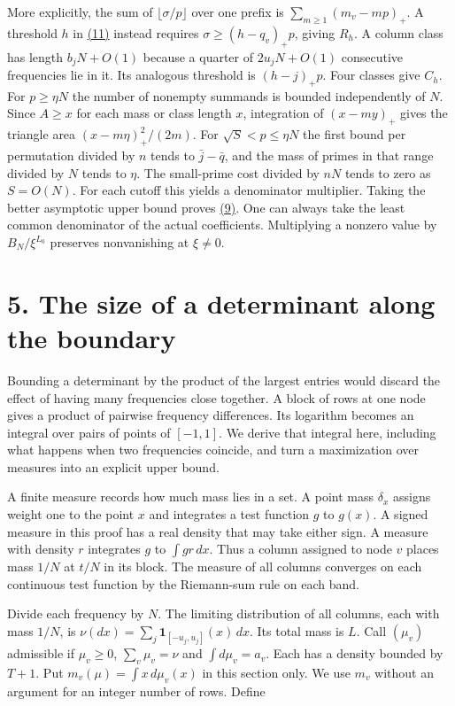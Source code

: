 \documentclass[11pt,a4paper]{article}
\newcounter{none}
\begin{document}
More explicitly, the sum of \(\lfloor\sigma/p\rfloor\) over one prefix is \(\sum_{m\ge1}(m_v-mp)_+\). A threshold \(h\) in \hyperref[eq:11]{(11)} instead requires \(\sigma\ge(h-q_v)_+p\), giving \(R_h\). A column class has length \(b_jN+O(1)\) because a quarter of \(2u_jN+O(1)\) consecutive frequencies lie in it. Its analogous threshold is \((h-j)_+p\). Four classes give \(C_h\). For \(p\ge\eta N\) the number of nonempty summands is bounded independently of \(N\). Since \(A\ge x\) for each mass or class length \(x\), integration of \((x-my)_+\) gives the triangle area \((x-m\eta)_+^2/(2m)\). For \(\sqrt S<p\le\eta N\) the first bound per permutation divided by \(n\) tends to \(\bar j-\bar q\), and the mass of primes in that range divided by \(N\) tends to \(\eta\). The small-prime cost divided by \(nN\) tends to zero as \(S=O(N)\). For each cutoff this yields a denominator multiplier. Taking the better asymptotic upper bound proves \hyperref[eq:9]{(9)}. One can always take the least common denominator of the actual coefficients. Multiplying a nonzero value by \(B_N/\xi^{L_0}\) preserves nonvanishing at \(\xi\ne0\).

\section{5. The size of a determinant along the boundary}\label{the-size-of-a-determinant-along-the-boundary}

Bounding a determinant by the product of the largest entries would discard the effect of having many frequencies close together. A block of rows at one node gives a product of pairwise frequency differences. Its logarithm becomes an integral over pairs of points of \([-1,1]\). We derive that integral here, including what happens when two frequencies coincide, and turn a maximization over measures into an explicit upper bound.

A finite measure records how much mass lies in a set. A point mass \(\delta_x\) assigns weight one to the point \(x\) and integrates a test function \(g\) to \(g(x)\). A signed measure in this proof has a real density that may take either sign. A measure with density \(r\) integrates \(g\) to \(\int gr\,dx\). Thus a column assigned to node \(v\) places mass \(1/N\) at \(t/N\) in its block. The measure of all columns converges on each continuous test function by the Riemann-sum rule on each band.

Divide each frequency by \(N\). The limiting distribution of all columns, each with mass \(1/N\), is \(\nu(dx)=\sum_j\mathbf1_{[-u_j,u_j]}(x)\,dx\). Its total mass is \(L\). Call \((\mu_v)\) admissible if \(\mu_v\ge0\), \(\sum_v\mu_v=\nu\) and \(\int d\mu_v=a_v\). Each has a density bounded by \(T+1\). Put \(m_v(\mu)=\int x\,d\mu_v(x)\) in this section only. We use \(m_v\) without an argument for an integer number of rows. Define
\end{document}
